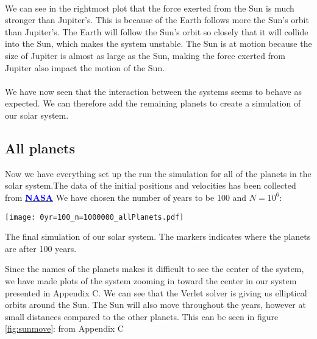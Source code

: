 \documentclass[12pt]{article}
\begin{document}
\hfill \\
	We can see in the rightmost plot that the force exerted from the Sun is much stronger than Jupiter's. This is because of the Earth follows more the Sun's orbit than Jupiter's. The Earth will follow the Sun's orbit so closely that it will collide into the Sun, which makes the system unstable. The Sun is at motion because the size of Jupiter is almost as large as the Sun, making the force exerted from Jupiter also impact the motion of the Sun. \\ \hfill \\
	We have now seen that the interaction between the systems seems to behave as expected. We can therefore add the remaining planets to create a simulation of our solar system.\newpage 
	\subsection{All planets}
	Now we have everything set up the run the simulation for all of the planets in the solar system.The data of the initial positions and velocities has been collected from \href{http://ssd.jpl.nasa.gov/horizons.cgi#top}{\textcolor{blue}{\textbf{NASA}}} We have chosen the number of years to be 100 and $N = 10^6$: 
	
		\centering
		\texttt{[image: 0yr=100\_n=1000000\_allPlanets.pdf]}
			\caption{The final simulation of our solar system. The markers indicates where the planets are after 100 years. }\label{fig:planets}
	\flushleft
\newpage
	Since the names of the planets makes it difficult to see the center of the system, we have made plots of the system zooming in toward the center in our system presented in Appendix C. We can see that the Verlet solver is giving us elliptical orbits around the Sun. The Sun will also move throughout the years, however at small distances compared to the other planets. This can be seen in figure \ref{fig:sunmove}: from Appendix C\\
\end{document}
